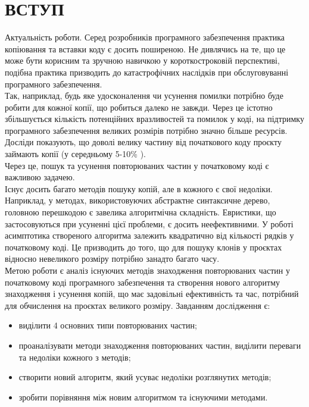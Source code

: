 \documentclass[a4paper, 14pt]{article}
\begin{document}
\section*{\textbf{ВСТУП}}
Актуальність роботи.
Серед розробників програмного забезпечення практика копіювання та вставки коду є досить поширеною. Не дивлячись на те, що це може бути корисним та зручною навичкою у короткостроковій перспективі, подібна практика призводить до катастрофічних наслідків при обслуговуванні програмного забезпечення. \\ Так, наприклад, будь яке удосконалення чи усунення помилки потрібно буде робити для кожної копії, що робиться далеко не завжди. Через це істотно збільшується кількість потенційних вразливостей та помилок у коді, на підтримку програмного забезпечення великих розмірів потрібно значно більше ресурсів. \\
Досліди показують, що доволі велику частину від початкового коду проєкту займають копії (у середньому 5-10\% \cite{Baxter98}). \\
Через це, пошук та усунення повторюваних частин у початковому коді є важливою задачею. \\
Існує досить багато методів пошуку копій, але в кожного є свої недоліки. Наприклад, у методах, використовуючих абстрактне синтаксичне дерево, головною перешкодою є завелика алгоритмічна складність. Евристики, що застосовуються при усуненні цієї проблеми, є досить неефективними. У роботі \cite{Baxter98} асимптотика створеного алгоритма залежить квадратично від кількості рядків у початковому коді. Це призводить до того, що для пошуку клонів у проєктах відносно невеликого розміру потрібно занадто багато часу. \cite{Sager06} \\
\newline Метою роботи є аналіз існуючих методів знаходження повторюваних частин у початковому коді програмного забезпечення та створення нового алгоритму знаходження і усунення копій, що має задовільні ефективність та час, потрібний для обчислення на проєктах великого розміру.
\newline Завданням дослідження є:
\begin{itemize}
	\item виділити 4 основних типи повторюваних частин;
	\item проаналізувати методи знаходження повторюваних частин, виділити переваги та недоліки кожного з методів;
	\item створити новий алгоритм, який усуває недоліки розглянутих методів;
	\item зробити порівняння між новим алгоритмом та існуючими методами.
\end{itemize}
\end{document}
